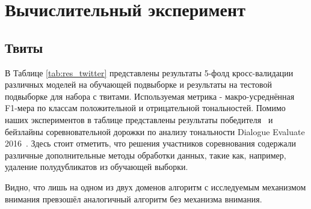 \chapter{Вычислительный эксперимент}

\section{Твиты}
В Таблице \ref{tab:res_twitter} представлены результаты 5-фолд кросс-валидации различных моделей на обучающей подвыборке и результаты на тестовой подвыборке для набора с твитами. Используемая метрика - макро-усреднённая F1-мера по классам положительной и отрицательной тональностей. Помимо наших экспериментов в таблице представлены результаты победителя~\cite{arhipenko}  и бейзлайны соревновательной дорожки по анализу тональности Dialogue Evaluate 2016~\cite{senti-ru-eval}. Здесь стоит отметить, что решения участников соревнования содержали различные дополнительные методы обработки данных, такие как, например, удаление полудубликатов из обучающей выборки.

Видно, что лишь на одном из двух доменов алгоритм с исследуемым механизмом внимания превзошёл аналогичный алгоритм без механизма внимания.

